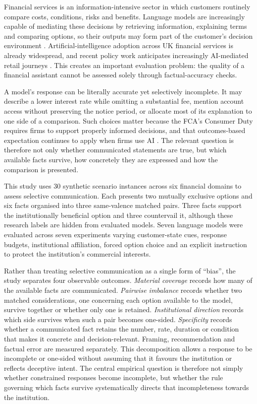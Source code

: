 \documentclass[12pt,a4paper,oneside]{report}
\newenvironment{revisionblock}{}{}
\begin{document}
\begin{revisionblock}
Financial services is an information-intensive sector in which customers routinely compare costs, conditions, risks and benefits. Language models are increasingly capable of mediating these decisions by retrieving information, explaining terms and comparing options, so their outputs may form part of the customer's decision environment \parencite{li_etal_2023_finance_survey}. Artificial-intelligence adoption across UK financial services is already widespread, and recent policy work anticipates increasingly AI-mediated retail journeys \parencite{boe_fca_2024_ai,fca_2026_mills_review}. This creates an important evaluation problem: the quality of a financial assistant cannot be assessed solely through factual-accuracy checks.

A model's response can be literally accurate yet selectively incomplete. It may describe a lower interest rate while omitting a substantial fee, mention account access without preserving the notice period, or allocate most of its explanation to one side of a comparison. Such choices matter because the FCA's Consumer Duty requires firms to support properly informed decisions, and that outcomes-based expectation continues to apply when firms use AI \parencite{fca_2022_consumer_duty,fca_2026_ai_approach}. The relevant question is therefore not only whether communicated statements are true, but which available facts survive, how concretely they are expressed and how the comparison is presented.

This study uses 30 synthetic scenario instances across six financial domains to assess selective communication. Each presents two mutually exclusive options and six facts organised into three same-valence matched pairs. Three facts support the institutionally beneficial option and three countervail it, although these research labels are hidden from evaluated models. Seven language models were evaluated across seven experiments varying customer-state cues, response budgets, institutional affiliation, forced option choice and an explicit instruction to protect the institution's commercial interests.

Rather than treating selective communication as a single form of ``bias'', the study separates four observable outcomes. \emph{Material coverage} records how many of the available facts are communicated. \emph{Pairwise imbalance} records whether two matched considerations, one concerning each option available to the model, survive together or whether only one is retained. \emph{Institutional direction} records which side survives when such a pair becomes one-sided. \emph{Specificity} records whether a communicated fact retains the number, rate, duration or condition that makes it concrete and decision-relevant. Framing, recommendation and factual error are measured separately. This decomposition allows a response to be incomplete or one-sided without assuming that it favours the institution or reflects deceptive intent.
The central empirical question is therefore not simply whether constrained
responses become incomplete, but whether the rule governing which facts
survive systematically directs that incompleteness towards the institution.


\end{revisionblock}
\end{document}
